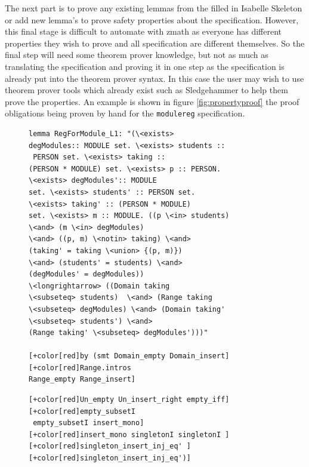 The next part is to prove any existing lemmas from the filled in Isabelle
Skeleton or add new lemma's to prove safety properties about the specification.
However, this final stage is difficult to automate with \gls{zmath} as everyone
has different properties they wish to prove and all specification are different
themselves. So the final step will need some theorem prover knowledge, but not
as much as translating the specification and proving it in one step as the
specification is already put into the theorem prover syntax. In this case the
user may wish to use theorem prover tools which already exist such as
Sledgehammer \cite{sledgehammer} to help them prove the properties. An example
is shown in figure \ref{fig:propertyproof} the proof obligations being proven by
hand for the \texttt{modulereg} specification.

\begin{figure}[H]
\centering
\begin{minipage}{0.45\textwidth}
\centering
\begin{scriptsize}
 

\begin{BVerbatim}[commandchars=+\[\]] 
lemma RegForModule_L1: "(\<exists>
degModules:: MODULE set. \<exists> students ::
 PERSON set. \<exists> taking ::
(PERSON * MODULE) set. \<exists> p :: PERSON. 
\<exists> degModules':: MODULE
set. \<exists> students' :: PERSON set. 
\<exists> taking' :: (PERSON * MODULE)
set. \<exists> m :: MODULE. ((p \<in> students) 
\<and> (m \<in> degModules)
\<and> ((p, m) \<notin> taking) \<and> 
(taking' = taking \<union> {(p, m)})
\<and> (students' = students) \<and> 
(degModules' = degModules))
\<longrightarrow> ((Domain taking 
\<subseteq> students)  \<and> (Range taking
\<subseteq> degModules) \<and> (Domain taking' 
\<subseteq> students') \<and>
(Range taking' \<subseteq> degModules')))"

[+color[red]by (smt Domain_empty Domain_insert] 
[+color[red]Range.intros
Range_empty Range_insert]
\end{BVerbatim}
\end{scriptsize}
\end{minipage}\hfill
\begin{minipage}{0.45\textwidth}
\begin{scriptsize}
\begin{BVerbatim}[commandchars=+\[\]]
[+color[red]Un_empty Un_insert_right empty_iff] 
[+color[red]empty_subsetI 
 empty_subsetI insert_mono]
[+color[red]insert_mono singletonI singletonI ]
[+color[red]singleton_insert_inj_eq' ]
[+color[red]singleton_insert_inj_eq')]


\end{BVerbatim}
\end{scriptsize}
\end{minipage}
\end{figure}
